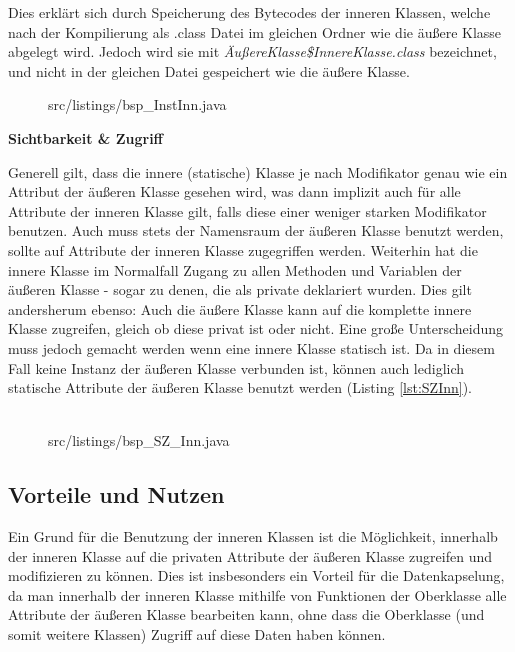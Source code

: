 Dies erklärt sich durch Speicherung des Bytecodes der inneren Klassen, welche nach
der Kompilierung als .class Datei im gleichen Ordner wie die äußere Klasse abgelegt
wird. Jedoch wird sie mit {\it ÄußereKlasse\$InnereKlasse.class} bezeichnet, und nicht in der gleichen Datei
gespeichert wie die äußere Klasse.

\begin{figure}[hbt]
\lstset{language=Java}
 {src/listings/bsp_InstInn.java}
\end{figure}

{\bf Sichtbarkeit \& Zugriff}

Generell gilt, dass die innere (statische) Klasse je nach Modifikator genau wie ein Attribut der äußeren Klasse gesehen wird, was dann implizit auch für alle Attribute der inneren Klasse gilt, falls diese einer weniger starken Modifikator benutzen.
Auch muss stets der Namensraum der äußeren Klasse benutzt werden, sollte auf Attribute der inneren Klasse zugegriffen werden.
Weiterhin hat die innere Klasse im Normalfall Zugang zu allen Methoden und Variablen der äußeren Klasse - sogar zu denen, die als private deklariert wurden.
Dies gilt andersherum ebenso: Auch die äußere Klasse kann auf die komplette innere Klasse zugreifen, gleich ob diese privat ist oder nicht.
Eine große Unterscheidung muss jedoch gemacht werden wenn eine innere Klasse statisch ist. Da in diesem Fall keine Instanz der äußeren Klasse verbunden ist, können auch lediglich statische Attribute der äußeren Klasse benutzt werden (Listing \ref{lst:SZInn}).
\\
\\
\begin{figure}[hbt]
\lstset{language=Java}
 {src/listings/bsp_SZ_Inn.java}
\end{figure}

\subsection{Vorteile und Nutzen}

Ein Grund für die Benutzung der inneren Klassen ist die Möglichkeit, innerhalb der inneren Klasse auf die privaten Attribute der äußeren Klasse zugreifen und modifizieren zu können.
Dies ist insbesonders ein Vorteil für die Datenkapselung, da man innerhalb der inneren Klasse mithilfe von Funktionen der Oberklasse alle Attribute der äußeren Klasse bearbeiten kann, ohne dass die Oberklasse (und somit weitere Klassen) Zugriff auf diese Daten haben können.

